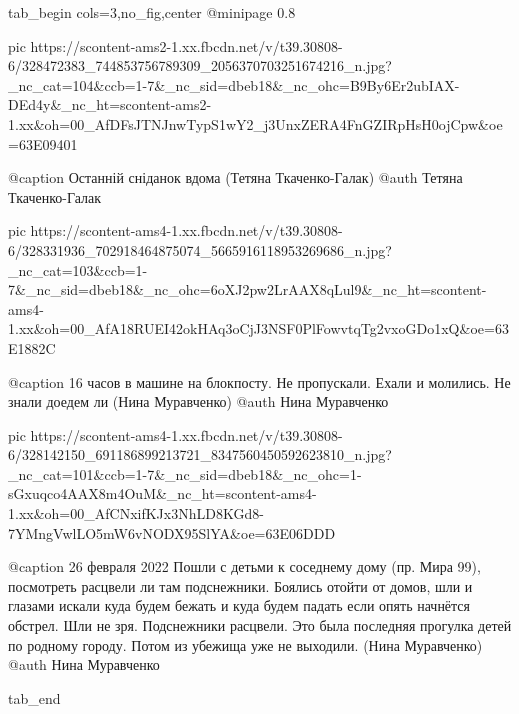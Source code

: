  
 
 
 
 

\clearpage
{}

\ifcmt
  tab_begin cols=3,no_fig,center
     @minipage 0.8

     pic https://scontent-ams2-1.xx.fbcdn.net/v/t39.30808-6/328472383_744853756789309_2056370703251674216_n.jpg?_nc_cat=104&ccb=1-7&_nc_sid=dbeb18&_nc_ohc=B9By6Er2ubIAX-DEd4y&_nc_ht=scontent-ams2-1.xx&oh=00_AfDFsJTNJnwTypS1wY2_j3UnxZERA4FnGZIRpHsH0ojCpw&oe=63E09401

     @caption Останній сніданок вдома (Тетяна Ткаченко-Галак)
     @auth Тетяна Ткаченко-Галак

     pic https://scontent-ams4-1.xx.fbcdn.net/v/t39.30808-6/328331936_702918464875074_5665916118953269686_n.jpg?_nc_cat=103&ccb=1-7&_nc_sid=dbeb18&_nc_ohc=6oXJ2pw2LrAAX8qLul9&_nc_ht=scontent-ams4-1.xx&oh=00_AfA18RUEI42okHAq3oCjJ3NSF0PlFowvtqTg2vxoGDo1xQ&oe=63E1882C

     @caption 16 часов в машине на блокпосту. Не пропускали. Ехали и молились. Не знали доедем ли (Нина Муравченко)
     @auth Нина Муравченко

     pic https://scontent-ams4-1.xx.fbcdn.net/v/t39.30808-6/328142150_691186899213721_8347560450592623810_n.jpg?_nc_cat=101&ccb=1-7&_nc_sid=dbeb18&_nc_ohc=1-sGxuqco4AAX8m4OuM&_nc_ht=scontent-ams4-1.xx&oh=00_AfCNxifKJx3NhLD8KGd8-7YMngVwlLO5mW6vNODX95SlYA&oe=63E06DDD

     @caption 26 февраля 2022 Пошли с детьми к соседнему дому (пр. Мира 99), посмотреть расцвели ли там подснежники. Боялись отойти от домов, шли и глазами искали куда будем бежать и куда будем падать если опять начнётся обстрел. Шли не зря. Подснежники расцвели. Это была последняя прогулка детей по родному городу. Потом из убежища уже не выходили. (Нина Муравченко)
     @auth Нина Муравченко

  tab_end
\fi

